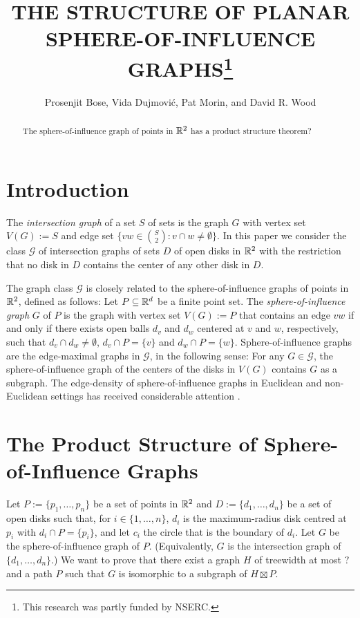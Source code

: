 \documentclass{patmorin}
\title{\MakeUppercase{The Structure of Planar Sphere-of-Influence Graphs}\thanks{This research was partly funded by NSERC.}}
\author{Prosenjit Bose, Vida Dujmović, Pat Morin, and David R. Wood}
\date{}
\begin{document}
\maketitle

\begin{abstract}
    The sphere-of-influence graph of points in $\mathbb{R}^2$ has a product structure theorem?
\end{abstract}

\section{Introduction}

The \emph{intersection graph} of a set $S$ of sets is the graph $G$ with vertex set $V(G):=S$ and edge set $\{vw\in\binom{S}{2}: v\cap w\neq\emptyset\}$.  In this paper we consider the class $\mathcal{G}$ of intersection graphs of sets $D$ of open disks in $\mathbb{R}^2$ with the restriction that no disk in $D$ contains the center of any other disk in $D$.

The graph class $\mathcal{G}$ is closely related to the sphere-of-influence graphs of points in $\mathbb{R}^2$, defined as follows:  Let $P\subseteq\mathbb{R}^d$ be a finite point set.  The \emph{sphere-of-influence graph} $G$ of $P$ is the graph with vertex set $V(G):=P$ that contains an edge $vw$ if and only if there exists open balls $d_v$ and $d_w$ centered at $v$ and $w$, respectively, such that $d_v\cap d_w\neq \emptyset$, $d_v\cap P=\{v\}$ and $d_w\cap P=\{w\}$.  Sphere-of-influence graphs are the edge-maximal graphs in $\mathcal{G}$, in the following sense: For any $G\in\mathcal{G}$, the sphere-of-influence graph of the centers of the disks in $V(G)$ contains $G$ as a subgraph.  The edge-density of sphere-of-influence graphs in Euclidean and non-Euclidean settings has received considerable attention  \cite{avis.horton:,michael.quint:sphere,soss:on,ismailescu.kim.ea:improved, dwyer:expected}.


\section{The Product Structure of Sphere-of-Influence Graphs}

Let $P:=\{p_1,\ldots,p_n\}$ be a set of points in $\mathbb{R}^2$ and $D:=\{d_1,\ldots,d_n\}$ be a set of open disks such that, for $i\in\{1,\ldots,n\}$,  $d_i$ is the maximum-radius disk centred at $p_i$ with $d_i\cap P=\{p_i\}$, and let $c_i$ the circle that is the boundary of $d_i$.  Let $G$ be the sphere-of-influence graph of $P$.  (Equivalently, $G$ is the intersection graph of $\{d_1,\ldots,d_n\}$.)  We want to prove that there exist a graph $H$ of treewidth at most $?$ and a path $P$ such that $G$ is isomorphic to a subgraph of $H\boxtimes P$. 
\end{document}

